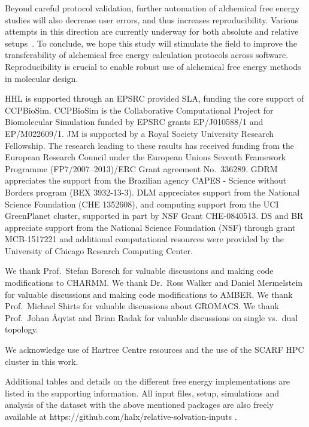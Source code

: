 \documentclass[journal=jctcce,manuscript=article]{achemso}
\begin{document}
 Beyond careful protocol validation,  further automation of alchemical free energy studies will also decrease user errors, and thus increases reproducibility.  Various attempts in
this direction are currently underway for both absolute and relative
setups~\cite{christ_accuracy_2013, JCC:JCC23804, Liu2013,
doi:10.1021/jp505332p, doi:10.1021/acs.jcim.6b00162,
doi:10.1021/acs.jctc.6b00979,loeffler_fesetup:_2015}. To conclude, we hope this study will stimulate the field to improve the transferability of alchemical free energy calculation protocols across software.  Reproducibility is crucial to enable robust use of alchemical free energy methods in molecular design.


\begin{acknowledgement}
  HHL is supported through an EPSRC provided SLA, funding the core
  support of CCPBioSim.  CCPBioSim is the Collaborative Computational
  Project for Biomolecular Simulation funded by EPSRC grants
  EP/J010588/1 and EP/M022609/1.  JM is supported by a Royal Society
  University Research Fellowship.  The research leading to these
  results has received funding from the European Research Council
  under the European Unions Seventh Framework Programme
  (FP7/2007--2013)/ERC Grant agreement No.\ 336289.  GDRM appreciates
  the support from the Brazilian agency CAPES - Science without
  Borders program (BEX 3932-13-3).  DLM appreciates support from the
  National Science Foundation (CHE 1352608), and computing support
  from the UCI GreenPlanet cluster, supported in part by NSF Grant
  CHE-0840513. DS and BR appreciate support from the National Science Foundation (NSF) through grant MCB-1517221 and additional computational resources were provided by the University of Chicago Research Computing Center.


  We thank Prof.\ Stefan Boresch for valuable discussions and making code
  modifications to CHARMM.  We thank Dr.\ Ross Walker and Daniel Mermelstein
  for valuable discussions and making code modifications to AMBER.  We thank
  Prof.\ Michael Shirts for valuable discussions about GROMACS.  We thank
  Prof.\ Johan \AA{}qvist and Brian Radak for valuable discussions on single
  vs.\ dual topology.

  We acknowledge use of Hartree Centre resources and the use of the
  SCARF HPC cluster in this work.
\end{acknowledgement}

\begin{suppinfo}
Additional tables and details on the different free energy
implementations are listed in the supporting information.  All input
files, setup, simulations and analysis of the dataset with the above
mentioned packages are also freely available at
https://github.com/halx/relative-solvation-inputs .

\end{suppinfo}


\end{document}
